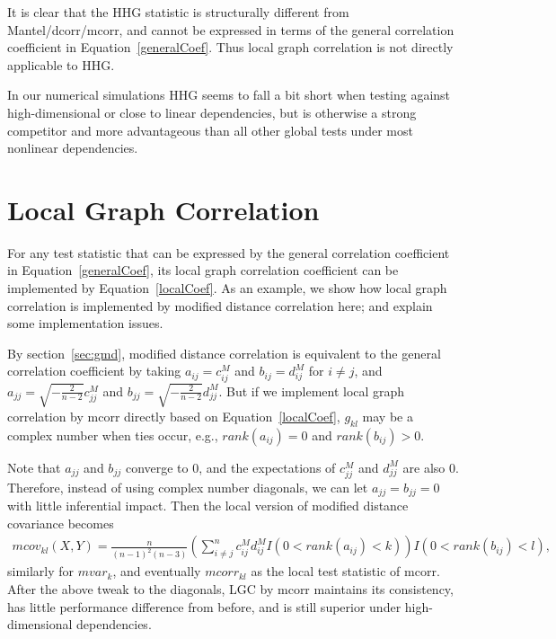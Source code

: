 \documentclass[11pt]{article}
\begin{document}
It is clear that the HHG statistic is structurally different from Mantel/dcorr/mcorr, and cannot be expressed in terms of the general correlation coefficient in Equation~\ref{generalCoef}. Thus local graph correlation is not directly applicable to HHG.

In our numerical simulations HHG seems to fall a bit short when testing against high-dimensional or close to linear dependencies, but is otherwise a strong competitor and more advantageous than all other global tests under most nonlinear dependencies. %

\section{Local Graph Correlation}
\label{main2}

For any test statistic that can be expressed by the general correlation coefficient in Equation~\ref{generalCoef}, its local graph correlation coefficient can be implemented by Equation~\ref{localCoef}. As an example, we show how local graph correlation is implemented by modified distance correlation here; and explain some implementation issues.

By section~\ref{sec:gmd}, modified distance correlation is equivalent to the general correlation coefficient by taking $a_{ij}=c^{M}_{ij}$ and $b_{ij}=d^{M}_{ij}$ for $i \neq j$, and $a_{jj}=\sqrt{-\frac{2}{n-2}}c^{M}_{jj}$ and $b_{jj}=\sqrt{-\frac{2}{n-2}}d^{M}_{jj}$. But if we implement local graph correlation by mcorr directly based on Equation~\ref{localCoef}, $g_{kl}$ may be a complex number when ties occur, e.g., $rank(a_{ij})=0$ and $rank(b_{ij})>0$.

Note that $a_{jj}$ and $b_{jj}$ converge to $0$, and the expectations of $c^{M}_{jj}$ and $d^{M}_{jj}$ are also $0$. Therefore, instead of using complex number diagonals, we can let $a_{jj}=b_{jj}=0$ with little inferential impact. Then the local version of modified distance covariance becomes
\begin{align*}
mcov_{kl}(X,Y) = \frac{n}{(n-1)^2(n-3)}(\sum_{i \neq j}^{n}c^{M}_{ij}d^{M}_{ij}I(0<rank(a_{ij})<k))I(0<rank(b_{ij})<l),
\end{align*}
similarly for $mvar_{k}$, and eventually $mcorr_{kl}$ as the local test statistic of mcorr. After the above tweak to the diagonals, LGC by mcorr maintains its consistency, has little performance difference from before, and is still superior under high-dimensional dependencies.
\end{document}
